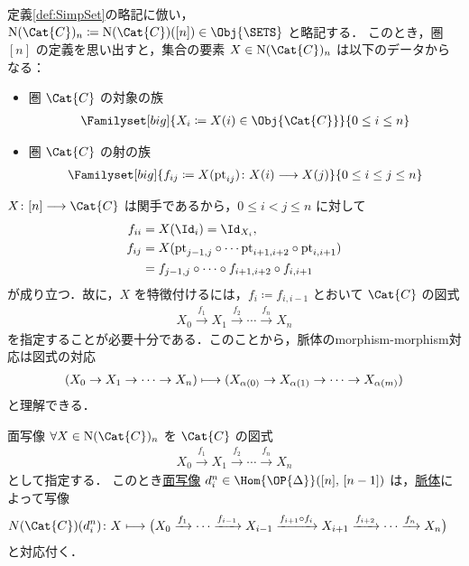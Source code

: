 \documentclass[TQFT_main]{subfiles}
\begin{document}
定義\ref{def:SimpSet}の略記に倣い，$\mathrm{N}(\Cat{C})_n \coloneqq \mathrm{N} (\Cat{C})([n]) \in \Obj{\SETS}$ と略記する．
このとき，圏 $[n]$ の定義を思い出すと，集合の要素 $X \in \mathrm{N}(\Cat{C})_n$ は以下のデータからなる：
\begin{itemize}
    \item 圏 $\Cat{C}$ の対象の族
    \begin{align}
        \Familyset[big]{X_i \coloneqq X (i) \in \Obj{\Cat{C}} }{0 \le i \le n}
    \end{align}
    \item 圏 $\Cat{C}$ の射の族
    \begin{align}
        \Familyset[big]{f_{ij} \coloneqq X(\mathrm{pt}_{ij}) \colon X(i) \lto X(j)}{0 \le i \le j \le n}
    \end{align}
\end{itemize}
$X \colon [n] \lto \Cat{C}$ は関手であるから，$0 \le i < j \le n$ に対して
\begin{align}
    f_{ii} &= X(\Id_i) = \Id_{X_i}, \\
    f_{ij} &= X(\mathrm{pt}_{j-1,j} \circ \cdots \mathrm{pt}_{i+1,i+2}\circ\mathrm{pt}_{i,i+1}) \\
    &= f_{j-1,j} \circ \cdots \circ f_{i+1,i+2} \circ f_{i,i+1}
\end{align}
が成り立つ．故に，$X$ を特徴付けるには，$f_i \coloneqq f_{i,i-1}$ とおいて $\Cat{C}$ の図式
\begin{align}
    \label{eq:nerve-spine}
    X_0 \xrightarrow{f_1} X_1 \xrightarrow{f_2} \cdots \xrightarrow{f_n} X_n
\end{align}
を指定することが必要十分である．このことから，脈体のmorphism-morphism対応は図式の対応
\begin{align}
    (X_0 \to X_1 \to \cdots \to X_n) \longmapsto (X_{\alpha(0)} \to X_{\alpha(1)} \to \cdots \to X_{\alpha(m)})
\end{align}
と理解できる．

\begin{myexample}[label=ex:nerve-face]{面写像}
    $\forall X \in \mathrm{N}(\Cat{C})_n$ を $\Cat{C}$ の図式
    \begin{align}
        X_0 \xrightarrow{f_1} X_1 \xrightarrow{f_2} \cdots \xrightarrow{f_n} X_n
    \end{align}
    として指定する．
    このとき\hyperref[def:simplex-cat]{面写像} $d^n_i \in \Hom{\OP{\Delta}}([n],\, [n-1])$ は，\hyperref[def:nerve]{脈体}によって写像
    \begin{align}
        N(\Cat{C})(d^n_i)\colon 
        X &\lmto \bigl( X_0 \xrightarrow{f_1} \cdots \xrightarrow{f_{i-1}} X_{i-1} \xrightarrow{f_{i+1} \circ f_{i}} X_{i+1} \xrightarrow{f_{i+2}} \cdots \xrightarrow{f_n} X_n \bigr) 
    \end{align}
    と対応付く．
\end{myexample}
\end{document}
